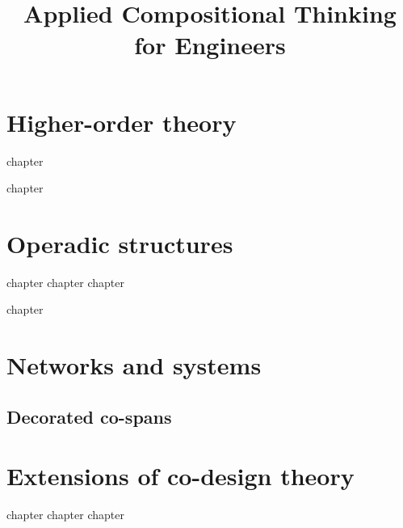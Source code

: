 

\title{Applied Compositional Thinking\\ for Engineers}
\date{}
\frontmatter

\tableofcontents
\mainmatter
\addtocounter{part}{8}
\addtocounter{chapter}{38}


\part{Higher-order theory}\label{part:higher-order}




{chapter}

{chapter}


\part{Operadic structures}\label{part:operads}


{chapter}
{chapter}
{chapter}

{chapter}


\part{Networks and systems}\label{part:networks}

\chapter{Decorated co-spans}


\part{Extensions of co-design theory}
{chapter}
{chapter}
{chapter}

\backmatter

\printbibliography
%
%

\printindex

%
%
%
%
%
%
